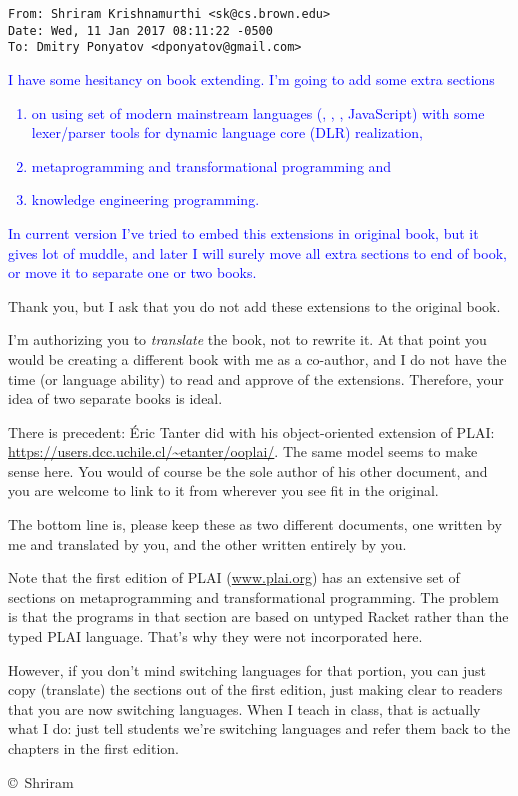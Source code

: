 \clearpage\label{krishna}
\begin{verbatim}
From: Shriram Krishnamurthi <sk@cs.brown.edu>
Date: Wed, 11 Jan 2017 08:11:22 -0500
To: Dmitry Ponyatov <dponyatov@gmail.com>
\end{verbatim}

\textcolor{BLUE}{
\noindent
I have some hesitancy on book extending. I'm going to add some extra sections
\begin{enumerate}[nosep]
  \item 
on using set of modern mainstream languages (\cpp, \java, \py, JavaScript)
with some lexer/parser tools for dynamic language core (DLR) realization,
  \item 
metaprogramming and transformational programming and
  \item 
knowledge engineering programming.
\end{enumerate} 
In current version I've tried to embed this extensions in original book, but it
gives lot of muddle, and later I will surely move all extra sections to end of
book, or move it to separate one or two books.
}

\bigskip
Thank you, but I ask that you do not add these extensions to the original book.

\bigskip
I'm authorizing you to \emph{translate} the book, not to rewrite it. At that
point you would be creating a different book with me as a co-author, and I do
not have the time (or language ability) to read and approve of the extensions.
Therefore, your idea of two separate books is ideal.

\bigskip
There is precedent: \'{E}ric Tanter did with his object-oriented extension of
PLAI: \url{https://users.dcc.uchile.cl/~etanter/ooplai/}. The same model seems
to make sense here. You would of course be the sole author of his other
document, and you are welcome to link to it from wherever you see fit in the
original.

\bigskip
The bottom line is, please keep these as two different documents, one written by
me and translated by you, and the other written entirely by you.

\bigskip
Note that the first edition of PLAI (\url{www.plai.org}) has an extensive set of
sections on metaprogramming and transformational programming. The problem is
that the programs in that section are based on untyped Racket rather than the
typed PLAI language. That's why they were not incorporated here.

However, if you don't mind switching languages for that portion, you can just
copy (translate) the sections out of the first edition, just making clear to
readers that you are now switching languages. When I teach in class, that is
actually what I do: just tell students we're switching languages and refer them
back to the chapters in the first edition.

\bigskip\copyright\ Shriram
